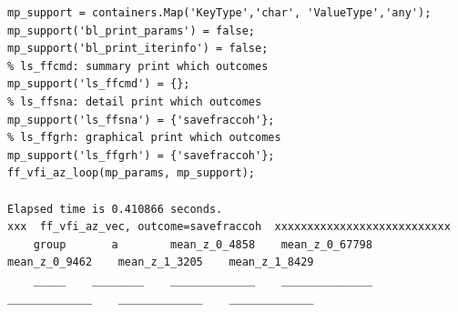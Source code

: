 \documentclass[
]{book}
\begin{document}
\begin{verbatim}
mp_support = containers.Map('KeyType','char', 'ValueType','any');
mp_support('bl_print_params') = false;
mp_support('bl_print_iterinfo') = false;
% ls_ffcmd: summary print which outcomes
mp_support('ls_ffcmd') = {};
% ls_ffsna: detail print which outcomes
mp_support('ls_ffsna') = {'savefraccoh'};
% ls_ffgrh: graphical print which outcomes
mp_support('ls_ffgrh') = {'savefraccoh'};
ff_vfi_az_loop(mp_params, mp_support);

Elapsed time is 0.410866 seconds.
xxx  ff_vfi_az_vec, outcome=savefraccoh  xxxxxxxxxxxxxxxxxxxxxxxxxxx
    group       a        mean_z_0_4858    mean_z_0_67798    mean_z_0_9462    mean_z_1_3205    mean_z_1_8429
    _____    ________    _____________    ______________    _____________    _____________    _____________


\end{verbatim}
\end{document}
